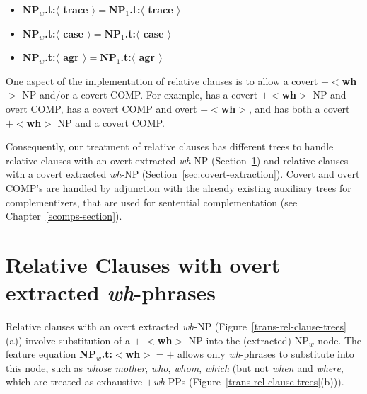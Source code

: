\begin{itemize}

\item {\bf NP$_{w}$.t:$\langle$ trace $\rangle =$NP$_{1}$.t:$\langle$ trace $\rangle$}
\item {\bf NP$_{w}$.t:$\langle$ case $\rangle =$NP$_{1}$.t:$\langle$ case $\rangle$}
\item {\bf NP$_{w}$.t:$\langle$ agr $\rangle =$NP$_{1}$.t:$\langle$ agr $\rangle$}

\end{itemize}

One aspect of the implementation of relative clauses is to allow a covert
{\bf $+<$wh$>$} NP and/or a covert COMP. For example,  has a covert
{\bf $+<$wh$>$} NP and overt COMP,  has a covert COMP and overt {\bf
$+<$wh$>$}, and  has both a covert {\bf $+<$wh$>$} NP and a covert
COMP.


Consequently, our treatment of relative clauses has different trees to
handle relative clauses with an overt extracted {\em wh}-NP
(Section~\ref{sec:overt-extraction}) and relative clauses with a covert
extracted {\em wh}-NP (Section~\ref{sec:covert-extraction}). Covert and
overt COMP's are handled by adjunction with the already existing auxiliary
trees for complementizers, that are used for sentential complementation
(see Chapter~\ref{scomps-section}).

\section{Relative Clauses with overt extracted {\em wh}-phrases}
\label{sec:overt-extraction}

Relative clauses with an overt extracted {\em wh}-NP
(Figure~\ref{trans-rel-clause-trees}(a)) involve substitution of a $+${\bf
$<$wh$>$} NP into the (extracted) NP$_{w}$ node. The feature equation {\bf
NP$_{w}$.t:$<$wh$>=+$} allows only {\it wh}-phrases to substitute into
this node, such as {\em whose mother}, {\em who}, {\em whom}, {\em which}
(but not {\em when} and {\em where}, which are treated as exhaustive
$+${\em wh} PPs (Figure~\ref{trans-rel-clause-trees}(b))).

